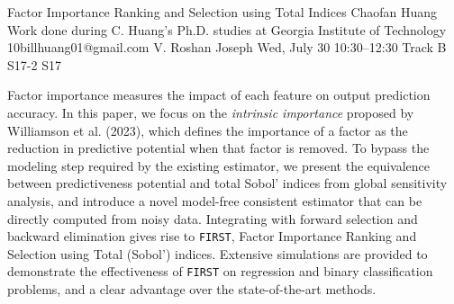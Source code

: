 \begin{talk}
  {Factor Importance Ranking and Selection using Total Indices}%
  {Chaofan Huang}%
  {Work done during C. Huang's Ph.D. studies at Georgia Institute of Technology}%
  {10billhuang01@gmail.com}%
  {V. Roshan Joseph}%
  {}%
  {Wed, July 30 10:30–12:30 Track B}%
  {S17-2}%
  {S17}%
  
				
			
Factor importance measures the impact of each feature on output prediction accuracy. In this paper, we focus on the \emph{intrinsic importance} proposed by Williamson et al. (2023), which defines the importance of a factor as the reduction in predictive potential when that factor is removed. To bypass the modeling step required by the existing estimator, we present the equivalence between predictiveness potential and total Sobol' indices from global sensitivity analysis, and introduce a novel model-free consistent estimator that can be directly computed from noisy data. Integrating with forward selection and backward elimination gives rise to \texttt{FIRST}, Factor Importance Ranking and Selection using Total (Sobol') indices. Extensive simulations are provided to demonstrate the effectiveness of \texttt{FIRST} on regression and binary classification problems, and a clear advantage over the state-of-the-art methods.
\end{talk}

